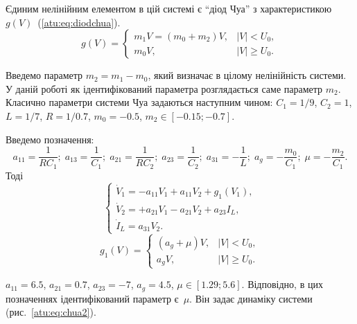 \documentclass[a4paper,13pt]{atuaref}
\begin{document}
Єдиним нелінійним елементом в цій системі є ``діод Чуа'' з характеристикою
$g(V)$~(\ref{atu:eq:diodchua}).
%
%
\begin{equation}
g(V) =
\begin{cases}
  m_1 V = ( m_0 + m_2 ) V , & |V| <   U_0, \\
  m_0 V ,                   & |V| \ge U_0.
\end{cases}
\label{atu:eq:diodchua}
\end{equation}

Введемо параметр \(m_2 = m_1 - m_0 \), який визначає в цілому нелінійність
системи. У даній роботі як ідентифікований параметра розглядається саме
параметр \(m_2 \).
Класично параметри системи Чуа задаються наступним чином:
$C_1 = 1/9$, $C_2 = 1$, $L= 1/7$, $R = 1/0.7$, $m_0=-0.5$, $ m_2 \in [ -0.15; -0.7 ] $.

Введемо позначення:
\[
  a_{11} = \frac{1}{R C_1}; \;
  a_{13} = \frac{1}{C_1}; \;
  a_{21} = \frac{1}{R C_2}; \;
  a_{23} = \frac{1}{C_2}; \;
  a_{31} = -\frac{1}{L}; \;
  a_g = - \frac{m_0}{C_1}; \;
  \mu = - \frac{m_2}{C_1}.
\]
%
Тоді
%
\begin{equation}
\begin{cases}
  \dot{V}_1  = -a_{11} V_1 + a_{11}  V_2  + g_1(V_1) , \\
  \dot{V}_2  = +a_{21} V_1 - a_{21}  V_2  + a_{23} I_L    , \\
  \dot{I}_L  =  a_{31} V_2.
\end{cases}
\label{atu:eq:chua2}
\end{equation}
%
%
\begin{equation}
g_1(V) =
\begin{cases}
  ( a_g + \mu ) V , & |V| <   U_0, \\
  a_g V           , & |V| \ge U_0.
\end{cases}
\label{atu:eq:diodchua2}
\end{equation}

\noindent
$ a_{11} = 6.5 $, $a_{21} = 0.7$, $ a_{23} = -7 $, $ a_g = 4.5 $,
$ \mu \in [ 1.29 ; 5.6 ] $.
Відповідно, в цих позначеннях ідентифікований параметр є~$\mu$.
Він задає динаміку системи (рис.~\ref{atu:eq:chua2}).
\end{document}
